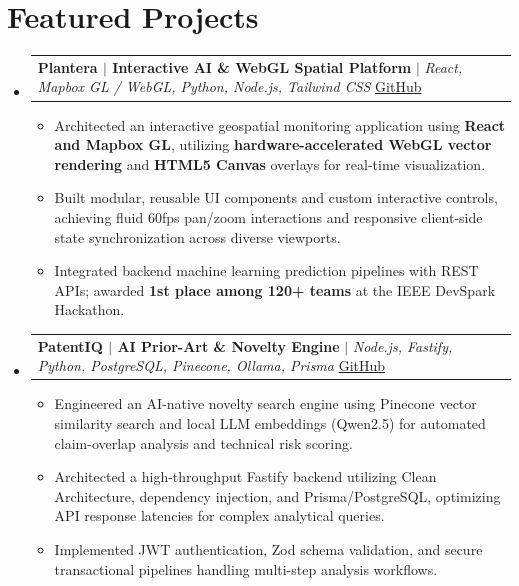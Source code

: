 \documentclass[letterpaper,10.5pt]{article}
\makeatletter
\newcommand{\resumeItem}[1]{
  \item\small{#1\vspace{-1pt}}
}
\newcommand{\resumeProjectHeading}[2]{
  \item
  \begin{tabular*}{0.97\textwidth}[t]{l@{\extracolsep{\fill}}r}
    \small#1 & #2 \\
  \end{tabular*}
  \vspace{1pt}
}
\newcommand{\resumeSubHeadingListStart}{
\begin{itemize}[
    leftmargin=0.15in,
    label={},
    itemsep=2pt,
    parsep=0pt,
    topsep=3pt,
    partopsep=0pt
]
}
\newcommand{\resumeSubHeadingListEnd}{
\end{itemize}
\vspace{-2pt}
}
\newcommand{\resumeItemListStart}{
\begin{itemize}[
    itemsep=1pt,
    parsep=0pt,
    topsep=1pt,
    partopsep=0pt,
    leftmargin=0.18in
]
}
\newcommand{\resumeItemListEnd}{
\end{itemize}
\vspace{-2pt}
}
\makeatother
\begin{document}
\section{Featured Projects}

\resumeSubHeadingListStart

\resumeProjectHeading
{\textbf{Plantera $|$ Interactive AI \& WebGL Spatial Platform} $|$
\emph{React, Mapbox GL / WebGL, Python, Node.js, Tailwind CSS}
\hfill
\href{https://github.com/rithishcodespace}{GitHub}}{}

\resumeItemListStart

    \resumeItem{Architected an interactive geospatial monitoring application using \textbf{React and Mapbox GL}, utilizing \textbf{hardware-accelerated WebGL vector rendering} and \textbf{HTML5 Canvas} overlays for real-time visualization.}

    \resumeItem{Built modular, reusable UI components and custom interactive controls, achieving fluid 60fps pan/zoom interactions and responsive client-side state synchronization across diverse viewports.}

    \resumeItem{Integrated backend machine learning prediction pipelines with REST APIs; awarded \textbf{1st place among 120+ teams} at the IEEE DevSpark Hackathon.}

\resumeItemListEnd

\resumeProjectHeading
{\textbf{PatentIQ $|$ AI Prior-Art \& Novelty Engine} $|$
\emph{Node.js, Fastify, Python, PostgreSQL, Pinecone, Ollama, Prisma}
\hfill
\href{https://github.com/rithishcodespace/PatentIQ}{GitHub}}{}

\resumeItemListStart

    \resumeItem{Engineered an AI-native novelty search engine using Pinecone vector similarity search and local LLM embeddings (Qwen2.5) for automated claim-overlap analysis and technical risk scoring.}

    \resumeItem{Architected a high-throughput Fastify backend utilizing Clean Architecture, dependency injection, and Prisma/PostgreSQL, optimizing API response latencies for complex analytical queries.}

    \resumeItem{Implemented JWT authentication, Zod schema validation, and secure transactional pipelines handling multi-step analysis workflows.}

\resumeItemListEnd

\resumeSubHeadingListEnd
\end{document}
